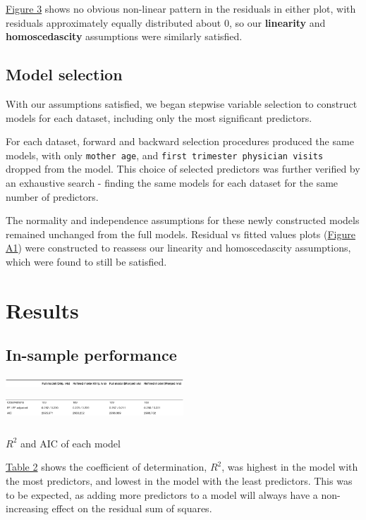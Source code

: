 \documentclass[letterpaper,9pt,twocolumn,twoside,]{pinp}
\begin{document}
\href{residvfittedfull}{Figure 3} shows no obvious non-linear pattern in
the residuals in either plot, with residuals approximately equally
distributed about 0, so our \textbf{linearity} and
\textbf{homoscedascity} assumptions were similarly satisfied.

\subsection{Model selection}\label{model-selection}

With our assumptions satisfied, we began stepwise variable selection to
construct models for each dataset, including only the most significant
predictors.

For each dataset, forward and backward selection procedures produced the
same models, with only \texttt{mother\ age}, and
\texttt{first\ trimester\ physician\ visits} dropped from the model.
This choice of selected predictors was further verified by an exhaustive
search - finding the same models for each dataset for the same number of
predictors.

The normality and independence assumptions for these newly constructed
models remained unchanged from the full models. Residual vs fitted
values plots (\href{figa1}{Figure A1}) were constructed to reassess our
linearity and homoscedascity assumptions, which were found to still be
satisfied.

\section{Results}\label{results}

\subsection{In-sample performance}\label{in-sample-performance}

\begin{table}[h]
  \includegraphics[width=0.5\textwidth, height=0.4cm]{titles}
  \includegraphics[width=0.5\textwidth, height=1.2cm]{results}
\caption{$R^2$ and AIC of each model}
\end{table}

\href{ll}{Table 2} shows the coefficient of determination, \(R^2\), was
highest in the model with the most predictors, and lowest in the model
with the least predictors. This was to be expected, as adding more
predictors to a model will always have a non-increasing effect on the
residual sum of squares.
\end{document}
